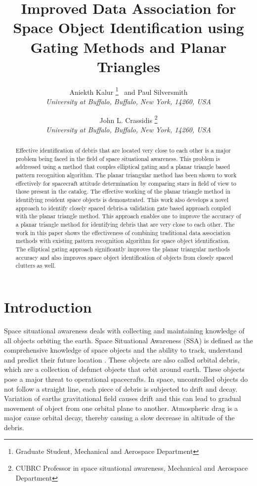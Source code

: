 \documentclass[]{aiaa-tc}%
\title{Improved Data Association for Space Object Identification using Gating Methods and Planar Triangles}
\author{
  Aniekth Kalur%
    \thanks{Graduate Student, Mechanical and Aerospace Department}
  \ and Paul Silversmith\thanksibid{1}\\
  {\normalsize\itshape
   University at Buffalo, Buffalo, New York, 14260, USA}\\
  \and
  John L. Crassidis%
   \thanks{CUBRC Professor in space situational awareness, Mechanical and Aerospace Department}\\
  {\normalsize\itshape
  University at Buffalo, Buffalo, New York, 14260, USA}
 }
\begin{document}
\maketitle

\begin{abstract}
Effective identification of debris that are located very close to each other is a major problem being faced in the field of space situational awareness. This problem is addressed using a method that couples elliptical gating and a planar triangle based pattern recognition algorithm. The planar triangular method has been shown to work effectively for spacecraft attitude determination by comparing stars in field of view to those present in the catalog. The effective working of the planar triangle method in identifying resident space objects is demonstrated. This work also develops a novel approach to identify closely spaced debris-a validation gate based approach  coupled with the planar triangle method. This approach enables one to improve the accuracy of a planar triangle method for identifying debris that are very close to each other. The work in this paper shows the effectiveness of combining traditional data association methods with existing pattern recognition algorithm for space object identification. The elliptical gating approach significantly improves the planar triangular methods accuracy and also improves space object identification  of objects from closely spaced clutters as well.
\end{abstract}


\section{Introduction}

Space situational awareness deals with collecting and maintaining knowledge of all objects orbiting the earth. Space Situational Awareness (SSA) is defined
as the comprehensive knowledge of space objects and the ability to track, understand and predict their future location \cite{becker_space_2015}. These objects are also called orbital debris, which are a collection of defunct objects that orbit around earth. These objects pose a major threat to operational spacecrafts. In space, uncontrolled objects do not follow a straight line, each piece of debris is subjected to drift and decay. Variation of earths gravitational field causes drift and this can lead to gradual movement of object from one orbital plane to another. Atmospheric drag is a major cause orbital decay, thereby causing a slow decrease in altitude of the debris. \\
\end{document}
